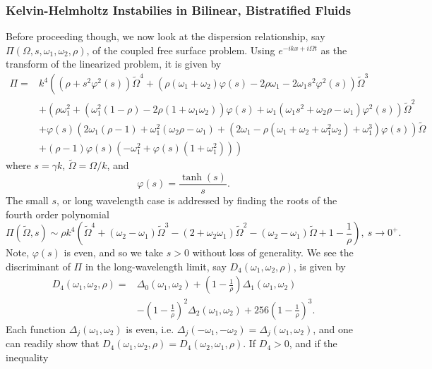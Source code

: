 \documentclass[a4paper,11pt]{article}
\begin{document}
\subsubsection*{Kelvin-Helmholtz Instabilies in Bilinear, Bistratified Fluids}
Before proceeding though, we now look at the dispersion relationship, say $\Pi(\Omega,s,\omega_{1},\omega_{2},\rho)$, of the coupled free surface problem.  Using $e^{-ikx+i\Omega t}$ as the transform of the linearized problem, it is given by 
\begin{align*}
\Pi = & k^{4}\left((\rho + s^{2}\varphi^{2}(s))\tilde{\Omega}^{4} + \left( \rho(\omega_{1}+\omega_{2})\varphi(s) -2\rho\omega_{1}-2\omega_{1}s^{2}\varphi^{2}(s)\right)\tilde{\Omega}^{3} \right.\\
& +\left(\rho\omega_{1}^{2}+(\omega_{1}^{2}(1-\rho) -2\rho(1+\omega_{1}\omega_{2}))\varphi(s) + \omega_{1}(\omega_{1}s^{2}+\omega_{2}\rho-\omega_{1})\varphi^{2}(s) \right)\tilde{\Omega}^{2}\\
& + \varphi(s)\left(2\omega_{1}(\rho-1)+\omega_{1}^{2}(\omega_{2}\rho-\omega_{1}) +  (2\omega_{1}-\rho(\omega_{1}+\omega_{2}+\omega_{1}^{2}\omega_{2})+\omega_{1}^{3})\varphi(s) \right)\tilde{\Omega}\\
& \left. + (\rho-1)\varphi(s)(-\omega_{1}^{2}+\varphi(s)(1+\omega_{1}^{2})) \right)
\end{align*}
where $s=\gamma k$, $\tilde{\Omega}=\Omega/k$, and 
\[
\varphi(s) = \frac{\tanh(s)}{s}.
\]
The small $s$, or long wavelength case is addressed by finding the roots of the fourth order polynomial
\[
\Pi(\tilde{\Omega},s) \sim \rho k^{4}\left( \tilde{\Omega}^{4} + (\omega_{2}-\omega_{1})\tilde{\Omega}^{3} -(2+ \omega_{2}\omega_{1})\tilde{\Omega}^{2} - \left( \omega_{2}-\omega_{1} \right) \tilde{\Omega} + 1- \frac{1}{\rho}\right), ~ s\rightarrow 0^{+}.
\]
Note, $\varphi(s)$ is even, and so we take $s>0$ without loss of generality.  We see the discriminant of $\Pi$ in the long-wavelength limit, say $D_{4}(\omega_{1},\omega_{2},\rho)$, is given by  
\begin{align*}
D_{4}(\omega_{1},\omega_{2},\rho) = &  \Delta_{0}(\omega_{1},\omega_{2}) + \left(1-\frac{1}{\rho}\right)\Delta_{1}(\omega_{1},\omega_{2}) \\
 & - \left(1-\frac{1}{\rho}\right)^{2}\Delta_{2}(\omega_{1},\omega_{2}) + 256\left(1-\frac{1}{\rho}\right)^{3}.
\end{align*}
Each function $\Delta_{j}(\omega_{1},\omega_{2})$ is even, i.e. $\Delta_{j}(-\omega_{1},-\omega_{2})=\Delta_{j}(\omega_{1},\omega_{2})$, and one can readily show that $D_{4}(\omega_{1},\omega_{2},\rho) = D_{4}(\omega_{2},\omega_{1},\rho) $.  If $D_{4}>0$, and if the inequality
\end{document}
